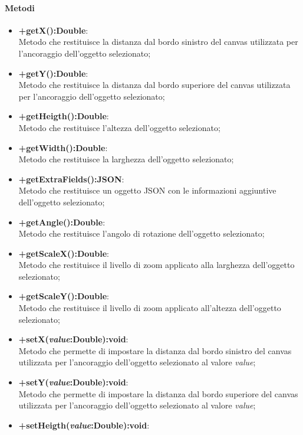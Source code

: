 	\paragraph{Metodi}
	\begin{itemize}
	\item \textbf{+getX():Double}:\\
		Metodo che restituisce la distanza dal bordo sinistro del canvas utilizzata per l'ancoraggio dell'oggetto selezionato;
	\item \textbf{+getY():Double}:\\
		Metodo che restituisce la distanza dal bordo superiore del canvas utilizzata per l'ancoraggio dell'oggetto selezionato;
	\item \textbf{+getHeigth():Double}:\\
		Metodo che restituisce l'altezza dell'oggetto selezionato;
	\item \textbf{+getWidth():Double}:\\
		Metodo che restituisce la larghezza dell'oggetto selezionato;
	\item \textbf{+getExtraFields():JSON}:\\
		Metodo che restituisce un oggetto JSON con le informazioni aggiuntive dell'oggetto selezionato;
	\item \textbf{+getAngle():Double}:\\
		Metodo che restituisce l'angolo di rotazione dell'oggetto selezionato;
	\item \textbf{+getScaleX():Double}:\\
		Metodo che restituisce il livello di zoom applicato alla larghezza dell'oggetto selezionato;
	\item \textbf{+getScaleY():Double}:\\
		Metodo che restituisce il livello di zoom applicato all'altezza dell'oggetto selezionato;
	\item \textbf{+setX(\textit{value}:Double):void}:\\
		Metodo che permette di impostare la distanza dal bordo sinistro del canvas utilizzata per l'ancoraggio dell'oggetto selezionato al valore \textit{value};
	\item \textbf{+setY(\textit{value}:Double):void}:\\
		Metodo che permette di impostare la distanza dal bordo superiore del canvas utilizzata per l'ancoraggio dell'oggetto selezionato al valore \textit{value};
	\item \textbf{+setHeigth(\textit{value}:Double):void}:\\

\end{itemize}
